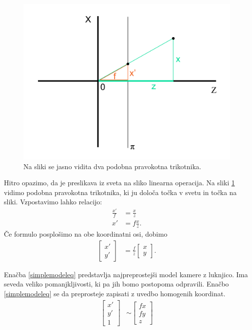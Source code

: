 \documentclass[a4paper, 12pt]{book}
\begin{document}
\begin{figure}[H]
\centering
\includegraphics[width=\textwidth,height=\textheight,keepaspectratio]{similar_triangles_2.png}
\caption{Na sliki se jasno vidita dva podobna pravokotna trikotnika.}
\label{similar2}
\end{figure}

Hitro opazimo, da je preslikava iz sveta na sliko linearna operacija. Na sliki \ref{similar2} vidimo podobna pravokotna trikotnika, ki ju določa točka v svetu in točka na sliki. Vzpostavimo lahko relacijo:
\begin{align}
\frac{x'}{f} &= \frac{x}{z} \\
x' &= f \frac{x}{z}.
\end{align}
Če formulo posplošimo na obe koordinatni osi, dobimo
\begin{align}
\begin{bmatrix}
x' \\
y'
\end{bmatrix}
&= \frac{f}{z}
\begin{bmatrix}
x \\
y
\end{bmatrix}.
\label{simplemodeleq}
\end{align}

Enačba \eqref{simplemodeleq} predstavlja najpreprostejši model kamere z luknjico. Ima seveda veliko pomanjkljivosti, ki pa jih bomo postopoma odpravili. Enačbo \eqref{simplemodeleq} se da preprosteje zapisati z uvedbo homogenih koordinat.
\begin{align}
\begin{bmatrix}
x' \\
y' \\
1
\end{bmatrix}
&\sim 
\begin{bmatrix}
fx \\
fy \\
z
\end{bmatrix}
\end{align}
\end{document}
